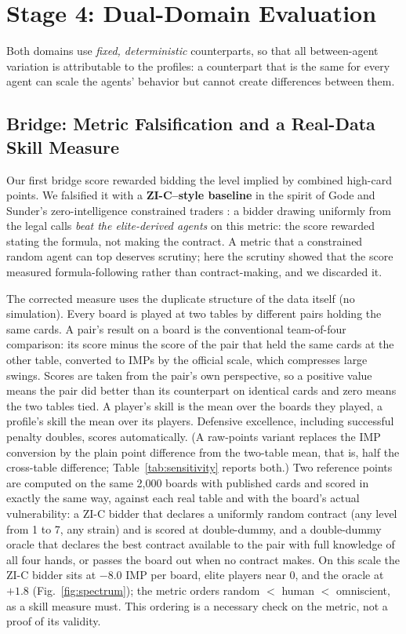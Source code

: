 \documentclass[runningheads]{llncs}
\begin{document}
\section{Stage 4: Dual-Domain Evaluation}\label{sec:stage4}

Both domains use \emph{fixed, deterministic} counterparts, so that all
between-agent variation is attributable to the profiles: a counterpart
that is the same for every agent can scale the agents' behavior but
cannot create differences between them.

\subsection{Bridge: Metric Falsification and a Real-Data Skill Measure}\label{sec:bridgemetric}

Our first bridge score rewarded bidding the level implied by combined
high-card points. We falsified it with a \textbf{ZI-C--style baseline}
in the spirit of Gode and Sunder's zero-intelligence constrained traders
\cite{gode1993zi}: a bidder drawing uniformly from the legal calls
\emph{beat the elite-derived agents} on this metric: the score
rewarded stating the formula, not making the contract. A metric that a
constrained random agent can top deserves scrutiny; here the scrutiny
showed that the score measured formula-following rather than
contract-making, and we discarded it.

The corrected measure uses the duplicate structure of the data itself
(no simulation). Every board is played at two tables by different
pairs holding the same cards. A pair's result on a board is the
conventional team-of-four comparison: its score minus the score of the
pair that held the same cards at the other table, converted to IMPs by
the official scale, which compresses large swings. Scores are taken
from the pair's own perspective, so a positive value means the pair
did better than its counterpart on identical cards and zero means the
two tables tied. A player's skill is the mean over the boards they
played, a profile's skill the mean over its players. Defensive
excellence, including successful penalty doubles, scores
automatically. (A raw-points variant replaces the IMP conversion by
the plain point difference from the two-table mean, that is, half the
cross-table difference; Table~\ref{tab:sensitivity} reports both.) Two
reference points are computed on the same 2{,}000 boards with
published cards and scored in exactly the same way, against each real
table and with the board's actual vulnerability: a ZI-C bidder that
declares a uniformly random contract (any level from 1 to 7, any
strain) and is scored at double-dummy, and a double-dummy oracle
\cite{ginsberg2001gib} that declares the best contract available to
the pair with full knowledge of all four hands, or passes the board out
when no contract makes. On this scale the ZI-C
bidder sits at $-8.0$ IMP per board, elite players near $0$, and the
oracle at $+1.8$ (Fig.~\ref{fig:spectrum}); the metric orders random
$<$ human $<$ omniscient, as a skill measure must. This ordering is a
necessary check on the metric, not a proof of its validity.
\end{document}
